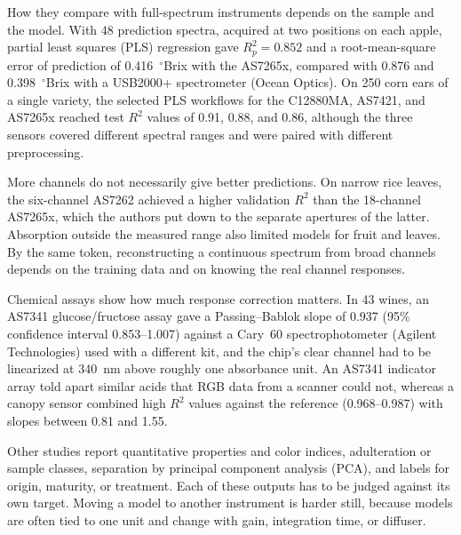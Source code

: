How they compare with full-spectrum instruments depends on the sample and the model. With 48 prediction spectra, acquired at two positions on each apple, partial least squares (PLS) regression gave $R^2_p=0.852$ and a root-mean-square error of prediction of 0.416~$^\circ$Brix with the AS7265x, compared with 0.876 and 0.398~$^\circ$Brix with a USB2000+ spectrometer (Ocean Optics).\citep{tran2020portable} On 250 corn ears of a single variety, the selected PLS workflows for the C12880MA, AS7421, and AS7265x reached test $R^2$ values of 0.91, 0.88, and 0.86, although the three sensors covered different spectral ranges and were paired with different preprocessing.\citep{himawan2026comparative}

More channels do not necessarily give better predictions. On narrow rice leaves, the six-channel AS7262 achieved a higher validation $R^2$ than the 18-channel AS7265x, which the authors put down to the separate apertures of the latter.\citep{lopin2025evaluation} Absorption outside the measured range also limited models for fruit and leaves.\citep{cano2024ataulfo,habibullah2020cost} By the same token, reconstructing a continuous spectrum from broad channels depends on the training data and on knowing the real channel responses.\citep{moralesguerra2026low,dolgalev2025development}

Chemical assays show how much response correction matters. In 43 wines, an AS7341 glucose/fructose assay gave a Passing--Bablok slope of 0.937 (95\% confidence interval 0.853--1.007) against a Cary~60 spectrophotometer (Agilent Technologies) used with a different kit, and the chip's clear channel had to be linearized at 340~nm above roughly one absorbance unit.\citep{tonelli2025portable} An AS7341 indicator array told apart similar acids that RGB data from a scanner could not,\citep{conrado2025beyond} whereas a canopy sensor combined high $R^2$ values against the reference (0.968--0.987) with slopes between 0.81 and 1.55.\citep{haryani2026evaluation}

Other studies report quantitative properties and color indices,\citep{sulistyo2021handheld,khairani2024rapid} adulteration or sample classes,\citep{rahmawati2024development,durgun2024real,gund2026development} separation by principal component analysis (PCA),\citep{wardana2025portable} and labels for origin, maturity, or treatment.\citep{habibullah2020low,sagita2025rapid,wrdana2025classification} Each of these outputs has to be judged against its own target. Moving a model to another instrument is harder still, because models are often tied to one unit\citep{stevens2024low} and change with gain, integration time, or diffuser.\citep{besozzi2026flexible,klueppel2026environmental}

